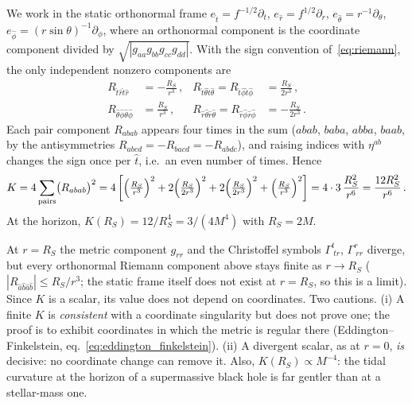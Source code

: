 \begin{derivation}
We work in the static orthonormal frame
$e_{\hat t} = f^{-1/2}\partial_t$, $e_{\hat r} = f^{1/2}\partial_r$,
$e_{\hat\theta} = r^{-1}\partial_\theta$, $e_{\hat\phi} = (r\sin\theta)^{-1}\partial_\phi$,
where an orthonormal component is the coordinate component divided by
$\sqrt{|g_{aa}g_{bb}g_{cc}g_{dd}|}$. With the sign convention of~\eqref{eq:riemann}, the only
independent nonzero components are
\begin{align*}
    R_{\hat t\hat r\hat t\hat r} &= -\frac{R_S}{r^3} \,, &
    R_{\hat t\hat\theta\hat t\hat\theta} = R_{\hat t\hat\phi\hat t\hat\phi} &= \frac{R_S}{2r^3} \,, \\
    R_{\hat\theta\hat\phi\hat\theta\hat\phi} &= \frac{R_S}{r^3} \,, &
    R_{\hat r\hat\theta\hat r\hat\theta} = R_{\hat r\hat\phi\hat r\hat\phi} &= -\frac{R_S}{2r^3} \,.
\end{align*}
Each pair component $R_{abab}$ appears four times in the sum ($abab$, $baba$, $abba$, $baab$, by
the antisymmetries $R_{abcd} = -R_{bacd} = -R_{abdc}$), and raising indices with
$\eta^{ab}$ changes the sign once per $\hat t$, i.e.\ an even number of times. Hence
\[
    K = 4\sum_{\text{pairs}} \bigl(R_{abab}\bigr)^2
      = 4\left[\Bigl(\tfrac{R_S}{r^3}\Bigr)^2 + 2\Bigl(\tfrac{R_S}{2r^3}\Bigr)^2
        + 2\Bigl(\tfrac{R_S}{2r^3}\Bigr)^2 + \Bigl(\tfrac{R_S}{r^3}\Bigr)^2\right]
      = 4 \cdot 3\,\frac{R_S^2}{r^6} = \frac{12 R_S^2}{r^6} \,.
\]
At the horizon, $K(R_S) = 12/R_S^4 = 3/(4M^4)$ with $R_S = 2M$.
\end{derivation}

\begin{annotation}
At $r = R_S$ the metric component $g_{rr}$ and the Christoffel symbols $\Gamma^t_{\ tr}$,
$\Gamma^r_{\ rr}$ diverge, but every orthonormal Riemann component above stays finite as
$r \to R_S$ ($|R_{\hat a\hat b\hat a\hat b}| \le R_S/r^3$; the static frame itself does not exist
at $r = R_S$, so this is a limit). Since $K$ is a scalar, its value does not depend
on coordinates. Two cautions. (i) A finite $K$ is \emph{consistent} with a coordinate singularity
but does not prove one; the proof is to exhibit coordinates in which the metric is regular there
(Eddington--Finkelstein, eq.~\eqref{eq:eddington_finkelstein}). (ii) A divergent scalar, as at
$r = 0$, \emph{is} decisive: no coordinate change can remove it.
Also, $K(R_S) \propto M^{-4}$: the tidal curvature at the horizon of a supermassive black
hole is far gentler than at a stellar-mass one.
\end{annotation}

